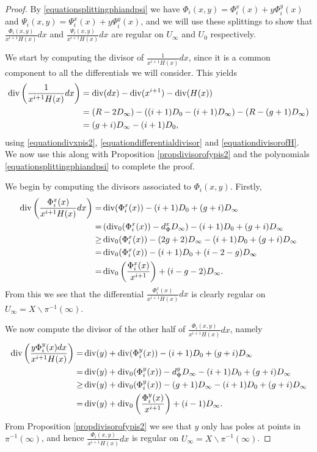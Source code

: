 \begin{proof}
    
    By \eqref{equationsplittingphiandpsi} we have $\Phi_i(x,y) = \Phi_i^x(x) + y\Phi_i^y(x)$ and $\Psi_i (x,y)= \Psi_i^x(x) + y\Psi_i^y(x)$, and we will use these splittings to show that $\frac{ \Phi_i(x,y) }{x^{i+1}H(x)}dx$ and $\frac{\Psi_i(x,y) }{x^{i+1}H(x)}dx$ are regular on $U_\infty$ and $U_0$ respectively.
    
    We start by computing the divisor of $\frac{1}{x^{i+1}H(x)}dx$, since it is a common component to all the differentials we will consider.
    This yields
        \begin{align*}
        \operatorname{div} \left( \frac{1}{x^{i+1}H(x)}dx \right) & = \operatorname{div}(dx) - \operatorname{div} (x^{i+1}) - \operatorname{div} (H(x)) \nonumber \\
        & = (R-2D_\infty) - ((i+1)D_0 - (i+1)D_\infty) - (R - (g+1)D_\infty) \nonumber \\
        & = (g+i)D_\infty - (i+1)D_0,
        \end{align*}
    using \eqref{equationdivxpis2}, \eqref{equationdifferentialdivisor}  and \eqref{equationdivisorofH}.
    We now use this along with Proposition \ref{propdivisorofypis2} and the polynomials \eqref{equationsplittingphiandpsi} to complete the proof.
    
    We begin by computing the divisors associated to $\Phi_i(x,y)$.
    Firstly,
        \begin{align*}
        \operatorname{div} \left( \frac{\Phi_i^x(x) }{x^{i+1} H(x)}dx \right)  = &  \operatorname{div}(\Phi_i^x(x)) -(i+1)D_0 + (g+i)D_\infty\\
         = & \left( \operatorname{div}_0(\Phi_i^x(x)) -d_\Phi^xD_\infty\right) -(i+1)D_0 + (g+i)D_\infty\\
         \geq & \operatorname{div}_0(\Phi_i^x(x)) - (2g+2)D_\infty - (i+1)D_0 + (g+i)D_\infty \\
         = &  \operatorname{div}_0(\Phi_i^x(x)) - (i+1)D_0 + (i-2-g)D_\infty \\
         =  & \operatorname{div}_0 \left( \frac{\Phi_i^x(x)}{x^{i+1}} \right) + (i-g-2)D_\infty.
        \end{align*}
    From this we see that the differential $\frac{\Phi_i^x(x)}{x^{i+1}H(x)}dx$ is clearly regular on $U_\infty = X \backslash \pi^{-1}(\infty)$.
    
    We now compute the divisor of the other half of $\frac{\Phi_i(x,y)}{x^{i+1}H(x)}dx$, namely
        \begin{align*}
        \operatorname{div}\left(\frac{y\Phi_i^y(x) dx}{x^{i+1}H(x)} \right)  = & \operatorname{div}(y) + \operatorname{div}(\Phi_i^y(x)) -(i+1)D_0 + (g+i)D_\infty\\
         = & \operatorname{div}(y) + \operatorname{div}_0(\Phi_i^y(x)) - d_\Phi^yD_\infty -(i+1)D_0 + (g+i)D_\infty \\
         \geq & \operatorname{div}(y) + \operatorname{div}_0(\Phi_i^y(x)) - (g+1)D_\infty - (i+1)D_0 + (g+i)D_\infty \\
         = & \operatorname{div}(y) + \operatorname{div}_0\left(\frac{\Phi_i^y(x)}{x^{i+1}} \right) + (i-1)D_\infty.
        \end{align*}
    From Proposition \ref{propdivisorofypis2} we see that $y$ only has poles at points in $\pi^{-1}(\infty)$, and hence $\frac{\Phi_i(x,y) }{x^{i+1}H(x)}dx$ is regular on $U_\infty = X \backslash \pi^{-1}(\infty)$.
    

\end{proof}

